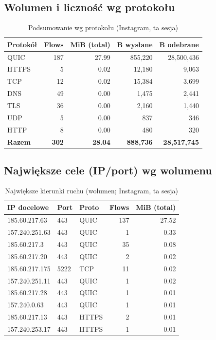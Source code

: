\subsection{Wolumen i liczność wg protokołu}
\begin{table}[htbp]
  \centering
  \caption{Podsumowanie wg protokołu (Instagram, ta sesja)}
  \label{tab:insta-proto}
  \begin{tabular}{lrrrr}
    \toprule
    \textbf{Protokół} & \textbf{Flows} & \textbf{MiB (total)} & \textbf{B wysłane} & \textbf{B odebrane} \\
    \midrule
    QUIC  & 187 & 27.99 & 855{,}220 & 28{,}500{,}436 \\
    HTTPS & 5   & 0.02  & 12{,}180  & 9{,}063 \\
    TCP   & 12  & 0.02  & 15{,}384  & 3{,}699 \\
    DNS   & 49  & 0.00  & 1{,}475   & 2{,}441 \\
    TLS   & 36  & 0.00  & 2{,}160   & 1{,}440 \\
    UDP   & 5   & 0.00  & 837       & 346 \\
    HTTP  & 8   & 0.00  & 480       & 320 \\
    \midrule
    \textbf{Razem} & \textbf{302} & \textbf{28.04} & \textbf{888{,}736} & \textbf{28{,}517{,}745} \\
    \bottomrule
  \end{tabular}
\end{table}

\subsection{Największe cele (IP/port) wg wolumenu}
\begin{table}[htbp]
  \centering
  \caption{Największe kierunki ruchu (wolumen; Instagram, ta sesja)}
  \label{tab:insta-topdst}
  \begin{tabular}{lllrr}
    \toprule
    \textbf{IP docelowe} & \textbf{Port} & \textbf{Proto} & \textbf{Flows} & \textbf{MiB (total)} \\
    \midrule
    185.60.217.63  & 443  & QUIC  & 137 & 27.52 \\
    157.240.251.63 & 443  & QUIC  & 1   & 0.33 \\
    185.60.217.3   & 443  & QUIC  & 35  & 0.08 \\
    185.60.217.20  & 443  & QUIC  & 2   & 0.02 \\
    185.60.217.175 & 5222 & TCP   & 11  & 0.02 \\
    157.240.251.11 & 443  & QUIC  & 1   & 0.02 \\
    185.60.217.28  & 443  & QUIC  & 1   & 0.01 \\
    157.240.0.63   & 443  & QUIC  & 1   & 0.01 \\
    185.60.217.13  & 443  & HTTPS & 2   & 0.01 \\
    157.240.253.17 & 443  & HTTPS & 1   & 0.01 \\
    \bottomrule
  \end{tabular}
\end{table}

